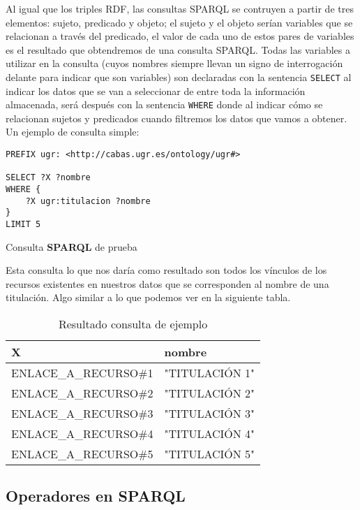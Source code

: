 \bigskip
Al igual que los triples {\sf RDF}, las consultas {\sf SPARQL} se contruyen a partir de tres elementos: sujeto, predicado y objeto; el sujeto y el objeto serían variables que se relacionan a través del predicado, el valor de cada uno de estos pares de variables es el resultado que obtendremos de una consulta {\sf SPARQL}. Todas las variables a utilizar en la consulta (cuyos nombres siempre llevan un signo de interrogación delante para indicar que son variables) son declaradas con la sentencia {\tt SELECT} al indicar los datos que se van a seleccionar de entre toda la información almacenada, será después con la sentencia {\tt WHERE} donde al indicar cómo se relacionan sujetos y predicados cuando filtremos los datos que vamos a obtener. Un ejemplo de consulta simple: 

\begin{listing}[!ht]
\begin{verbatim}
PREFIX ugr: <http://cabas.ugr.es/ontology/ugr#>

SELECT ?X ?nombre
WHERE {
    ?X ugr:titulacion ?nombre
}
LIMIT 5
\end{verbatim}
\caption{Consulta {\bf SPARQL} de prueba}
\end{listing}

Esta consulta lo que nos daría como resultado son todos los vínculos de los recursos existentes en nuestros datos que se corresponden al nombre de una titulación. Algo similar a lo que podemos ver en la siguiente tabla.

\begin{table}[!ht]
	\centering
	\begin{tabular}{|p{}|p{}|}
		\hline
		\textbf{X} &
		\textbf{nombre}
		\\ \hline
		ENLACE\_A\_RECURSO\#1&
		"TITULACIÓN 1"
		\\ \hline
		ENLACE\_A\_RECURSO\#2&
		"TITULACIÓN 2"
		\\ \hline
		ENLACE\_A\_RECURSO\#3&
		"TITULACIÓN 3"
		\\ \hline
		ENLACE\_A\_RECURSO\#4&
		"TITULACIÓN 4"
		\\ \hline
		ENLACE\_A\_RECURSO\#5&
		"TITULACIÓN 5"
		\\ \hline
	\end{tabular}
	\caption{Resultado consulta de ejemplo}
	\label{consulta-ejemplo}
\end{table}

\subsection{Operadores en SPARQL}

